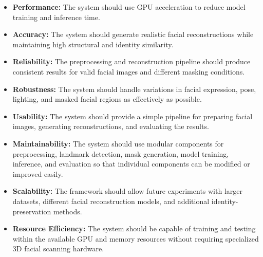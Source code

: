 \begin{itemize}
\item \textbf{Performance:} The system should use GPU acceleration to reduce model training and inference time.

\item \textbf{Accuracy:} The system should generate realistic facial reconstructions while maintaining high structural and identity similarity.

\item \textbf{Reliability:} The preprocessing and reconstruction pipeline should produce consistent results for valid facial images and different masking conditions.

\item \textbf{Robustness:} The system should handle variations in facial expression, pose, lighting, and masked facial regions as effectively as possible.

\item \textbf{Usability:} The system should provide a simple pipeline for preparing facial images, generating reconstructions, and evaluating the results.

\item \textbf{Maintainability:} The system should use modular components for preprocessing, landmark detection, mask generation, model training, inference, and evaluation so that individual components can be modified or improved easily.

\item \textbf{Scalability:} The framework should allow future experiments with larger datasets, different facial reconstruction models, and additional identity-preservation methods.

\item \textbf{Resource Efficiency:} The system should be capable of training and testing within the available GPU and memory resources without requiring specialized 3D facial scanning hardware.
\end{itemize}
\newpage

